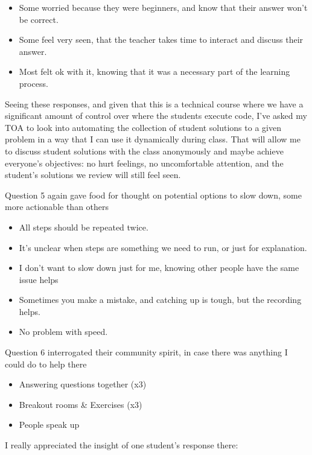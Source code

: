 \documentclass[paper=a4,justified,a4paper]{tufte-handout}
\providecommand{\tightlist}{%
  \setlength{\itemsep}{0pt}\setlength{\parskip}{0pt}}
\begin{document}
\begin{itemize}
\tightlist
\item
  Some worried because they were beginners, and know that their answer
  won't be correct.
\item
  Some feel very seen, that the teacher takes time to interact and
  discuss their answer.
\item
  Most felt ok with it, knowing that it was a necessary part of the
  learning process.
\end{itemize}

Seeing these responses, and given that this is a technical course where
we have a significant amount of control over where the students execute
code, I've asked my TOA to look into automating the collection of
student solutions to a given problem in a way that I can use it
dynamically during class. That will allow me to discuss student
solutions with the class anonymously and maybe achieve everyone's
objectives: no hurt feelings, no uncomfortable attention, and the
student's solutions we review will still feel seen.

Question 5 again gave food for thought on potential options to slow
down, some more actionable than others

\begin{itemize}
\tightlist
\item
  All steps should be repeated twice.
\item
  It's unclear when steps are something we need to run, or just for
  explanation.
\item
  I don't want to slow down just for me, knowing other people have the
  same issue helps
\item
  Sometimes you make a mistake, and catching up is tough, but the
  recording helps.
\item
  No problem with speed.
\end{itemize}

Question 6 interrogated their community spirit, in case there was
anything I could do to help there

\begin{itemize}
\tightlist
\item
  Answering questions together (x3)
\item
  Breakout rooms \& Exercises (x3)
\item
  People speak up
\end{itemize}

I really appreciated the insight of one student's response there:
\end{document}
